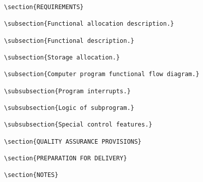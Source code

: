 \begin{itemize}
\begin{small}
\begin{verbatim}
\section{REQUIREMENTS}

\subsection{Functional allocation description.}

\subsection{Functional description.}

\subsection{Storage allocation.}

\subsection{Computer program functional flow diagram.}

\subsubsection{Program interrupts.}

\subsubsection{Logic of subprogram.}

\subsubsection{Special control features.}

\section{QUALITY ASSURANCE PROVISIONS}

\section{PREPARATION FOR DELIVERY}

\section{NOTES}


\end{verbatim}
\end{small}
\end{itemize}
